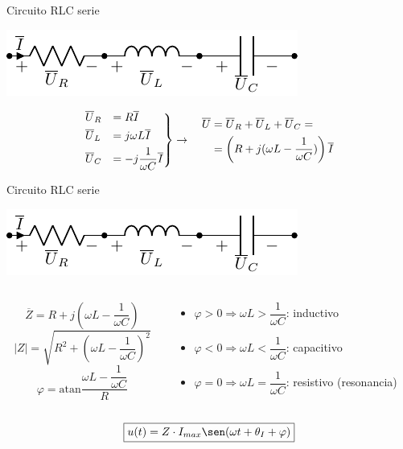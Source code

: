\documentclass[aspectratio=169, usenames,svgnames,dvipsnames]{beamer}
\newcommand{\atan}{\mathrm{atan}}
\begin{document}
\begin{frame}[label={sec:org93ce28b}]{Circuito RLC serie}
\begin{center}
\includegraphics[height=0.2\textheight]{../figs/RLC.pdf}
\end{center}

\[
\begin{rcases}
  \overline{U}_R &= R \overline{I}\\
  \overline{U}_L &= j\omega L \overline{I}\\
  \overline{U}_C &= -j \dfrac{1}{\omega C} \overline{I}
\end{rcases} \rightarrow \quad
\begin{aligned}
  \overline{U} &= \overline{U}_R + \overline{U}_L + \overline{U}_C =\\
               &= \left(R + j(\omega L - \dfrac{1}{\omega C})\right) \overline{I} 
\end{aligned}
\]
\end{frame}

\begin{frame}[label={sec:org7d124ea}]{Circuito RLC serie}
\begin{center}
\includegraphics[height=0.2\textheight]{../figs/RLC.pdf}
\end{center}

\begin{columns}
\begin{column}{0.4\columnwidth}
\[
\overline{Z} = R + j(\omega L - \dfrac{1}{\omega C})
\]
\[
  |Z| = \sqrt{R^2 + (\omega L - \dfrac{1}{\omega C})^2}
\]
\[
  \varphi = \atan{\dfrac{\omega L - \dfrac{1}{\omega C}}{R}}
\]
\end{column}

\begin{column}{0.6\columnwidth}
\begin{itemize}
\item \(\varphi > 0 \Rightarrow \omega L > \dfrac{1}{\omega C}\): inductivo
\item \(\varphi < 0 \Rightarrow \omega L < \dfrac{1}{\omega C}\): capacitivo
\item \(\varphi = 0 \Rightarrow \omega L = \dfrac{1}{\omega C}\): resistivo (resonancia)
\end{itemize}
\end{column}
\end{columns}

\[
\boxed{u(t) = Z \cdot I_{max} \sen(\omega t + \theta_I + \varphi)}
\]
\end{frame}
\end{document}
